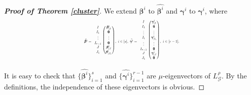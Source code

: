\documentclass{amsart}
\theoremstyle{remark}
\begin{document}
\begin{proof}[\textbf{Proof of Theorem \ref{cluster}}]

We extend $\pmb{\beta}^{i}$ to $\widehat{\pmb{\beta}^{i}}$ and $\pmb{\gamma}^{i}$ to $\widehat{\pmb{\gamma}^{i}}$, where
\begin{equation*}
\resizebox{0.4 \textwidth}{!}{ 
$\widehat{\pmb{\beta}^{i}}=\begin{blockarray}{cc}
\begin{block}{c(c)}
  I& \pmb{\beta}^{i}_{|I}\\
  I_{1}&\pmb{0}  \\
\vdots&\vdots  \\
  I_{r-1}&\pmb{0}  \\
  J&\pmb{\beta}^{i}_{|J}  \\
  J_{1}&\pmb{\beta}^{i}_{|J_{1}}  \\ 
\end{block}
\end{blockarray}\,\,,\,\, i\in [s],\,\,
\widehat{\pmb{\gamma}^{i}}=\begin{blockarray}{cc}
\begin{block}{c(c)}
  I& \pmb{\gamma}^{i}_{|I}\\
  I_{1}&\pmb{0}  \\
\vdots&\vdots  \\
 I_{i}& \pmb{\gamma}^{i}_{|I_{i}}\\
\vdots&\vdots  \\
  I_{r-1}&\pmb{0}  \\
  J&\pmb{\gamma}^{i}_{|J}  \\
  J_{1}&\pmb{0}  \\ 
\end{block}
\end{blockarray}\,\,,\,\,i\in [r-1].$
}\end{equation*}
It is easy to check that $\{\widehat{\pmb{\beta}^{i}}\}_{i=1}^{s}$ and $\{\widehat{\pmb{\gamma}^{i}}\}_{i=1}^{r-1}$ are  $\mu$-eigenvectors of $L_{\mathcal{G}}^{\rho}$. By the definitions, the independence of these eigenvectors is obvious.
\end{proof}

\end{document}
